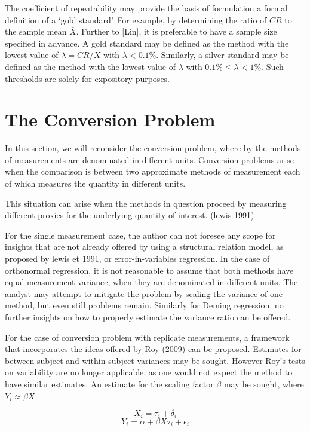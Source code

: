 \documentclass[12pt, a4paper]{report}
\theoremstyle{plain}
\theoremstyle{definition}
\theoremstyle{remark}
\begin{document}
	The coefficient of repeatability may provide the basis of formulation a formal definition of a `gold standard'. For example, by determining the ratio of $CR$ to the sample mean $\bar{X}$. Further to [Lin], it is preferable to have a sample size specified in advance. A gold standard may be defined as the method with the lowest value of $\lambda = CR /\bar{X}$ with $\lambda < 0.1\%$. Similarly, a silver standard may be defined as the method with the lowest value of $\lambda $ with $0.1\% \leq \lambda < 1\%$. Such thresholds are solely for expository purposes.
	
	\section{The Conversion Problem}

In this section, we will reconsider the conversion problem, where by the methods of measurements are denominated in different units.
Conversion problems arise when the comparison is between two 
approximate methods of measurement each of which measures the quantity in different units.

This situation can arise when the methods in question proceed by measuring different proxies for the underlying 
quantity of interest. (lewis 1991)

For the single measurement case, the author can not foresee any scope for insights that are not already offered by using a structural relation model, as proposed by lewis et 1991, or error-in-variables regression. 
In the case of orthonormal regression, it is not reasonable to assume that both methods have equal measurement variance, when they are denominated in different units.
The analyst may attempt to mitigate the problem by scaling the variance of one method, but even still problems remain.
Similarly for Deming regression, no further insights on how to properly estimate the variance ratio can be offered.

For the case of conversion problem with replicate measurements, a framework that incorporates the ideas offered by Roy (2009) can be proposed. Estimates for between-subject and within-subject variances may be sought.
However Roy's tests on variability are no longer applicable, as one would not expect the method to have similar estimates. An estimate for the scaling factor $\beta$ may be sought, where $Y_i \approx \beta X$.


\[ X_i = \tau_i + \delta_i \]
\[ Y_i = \alpha + \beta X \tau_i + \epsilon_i\]
\end{document}
